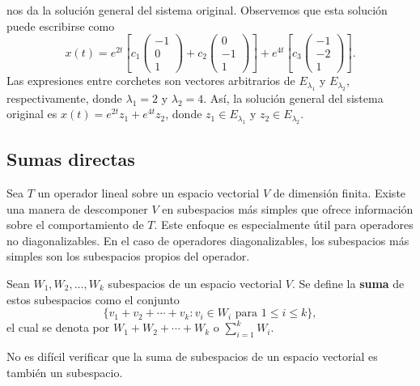 \documentclass[12pt,a4paper]{book}
\begin{document}
    nos da la solución general del sistema original. Observemos que esta solución puede escribirse como
    \begin{equation*}
        x(t)=e^{2t}\left[c_1\begin{pmatrix}-1\\0\\1\end{pmatrix}+c_2\begin{pmatrix}0\\-1\\1\end{pmatrix}\right]+e^{4t}\left[c_3\begin{pmatrix}-1\\-2\\1\end{pmatrix}\right].
    \end{equation*}
    Las expresiones entre corchetes son vectores arbitrarios de $E_{\lambda_1}$ y $E_{\lambda_2}$, respectivamente, donde $\lambda_1=2$ y $\lambda_2=4$. Así, la solución general del sistema original es $x(t)=e^{2t}z_1+e^{4t}z_2$, donde $z_1\in E_{\lambda_1}$ y $z_2\in E_{\lambda_2}$.

    \subsection*{Sumas directas}

    Sea $T$ un operador lineal sobre un espacio vectorial $V$ de dimensión finita. Existe una manera de descomponer $V$ en subespacios más simples que ofrece información sobre el comportamiento de $T$. Este enfoque es especialmente útil para operadores no diagonalizables. En el caso de operadores diagonalizables, los subespacios más simples son los subespacios propios del operador.

    \begin{definicion}
        Sean $W_1,W_2,\dots,W_k$ subespacios de un espacio vectorial $V$. Se define la \textbf{suma} de estos subespacios como el conjunto
        \begin{equation*}
            \{v_1+v_2+\cdots+v_k: v_i\in W_i \text{ para } 1\leq i\leq k\},
        \end{equation*}
        el cual se denota por $W_1+W_2+\cdots+W_k$ o $\sum_{i=1}^{k}W_i$.
    \end{definicion}

    No es difícil verificar que la suma de subespacios de un espacio vectorial es también un subespacio.
\end{document}
